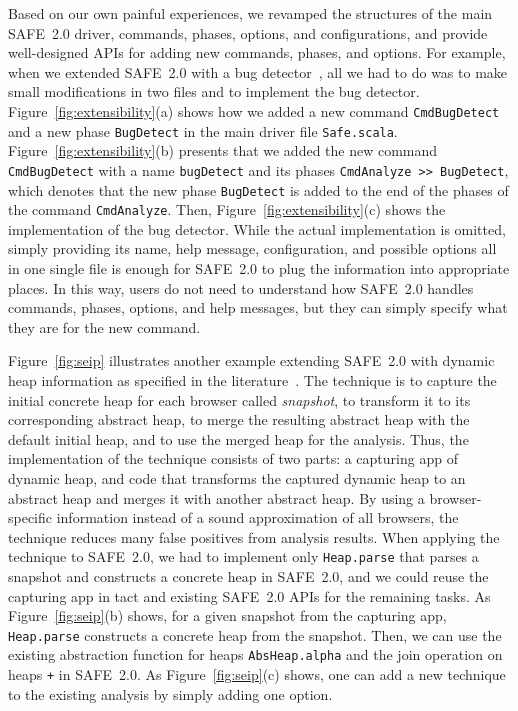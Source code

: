 \documentclass[10pt, conference]{IEEEtran}
\newcommand{\mtt}[1]{\texttt{\small #1}}
\newcommand{\safe}{{SAFE~2.0}\xspace}
\begin{document}
Based on our own painful experiences, we revamped the structures of
the main \safe driver, commands, phases, options, and configurations,
and provide well-designed APIs for adding new commands, phases, and
options.  For example, when we extended \safe with a bug
detector~\cite{jswapp}, all we had to do was to make small
modifications in two files and to implement the bug detector.
Figure~\ref{fig:extensibility}(a) shows how we added a new command
\mtt{CmdBugDetect} and a new phase \mtt{BugDetect} in the main
driver file \mtt{Safe.scala}.  Figure~\ref{fig:extensibility}(b) presents
that we added the new command \mtt{CmdBugDetect} with a name
\mtt{bugDetect} and its phases \mtt{CmdAnalyze >> BugDetect},
which denotes that the new phase \mtt{BugDetect} is added to the end
of the phases of the command \mtt{CmdAnalyze}.  Then,
Figure~\ref{fig:extensibility}(c) shows the implementation of the
bug detector.  While the actual implementation is omitted,
simply providing its name, help message, configuration, and possible
options all in one single file is enough for \safe to plug the
information into appropriate places.  In this way, users do not
need to understand how \safe handles commands, phases, options, and
help messages, but they can simply specify what they are for the new
command.

Figure~\ref{fig:seip} illustrates another example extending \safe
with dynamic heap information as specified in the
literature~\cite{safehybrid}.  The technique is to capture the initial
concrete heap for each browser called \emph{snapshot}, to transform
it to its corresponding abstract heap, to merge the resulting
abstract heap with the default initial heap, and to use the merged heap
for the analysis.  Thus, the implementation of the technique consists
of two parts: a capturing app of dynamic heap, and code that
transforms the captured dynamic heap to an abstract heap and merges it
with another abstract heap.  By using a browser-specific information
instead of a sound approximation of all browsers, the technique reduces many false positives
from analysis results.  When applying the technique to \safe,
we had to implement only \mtt{Heap.parse} that parses a snapshot and
constructs a concrete heap in \safe, and we could reuse the capturing app in tact
and existing \safe APIs for the remaining tasks.
As Figure~\ref{fig:seip}(b) shows, for a given snapshot from the capturing
app, \mtt{Heap.parse} constructs a concrete heap from the
snapshot.  Then, we can use the existing abstraction function for heaps
\mtt{AbsHeap.alpha} and the join operation on heaps \mtt{+} in \safe.
As Figure~\ref{fig:seip}(c) shows, one can add a new technique
to the existing analysis by simply adding one option.
\end{document}
